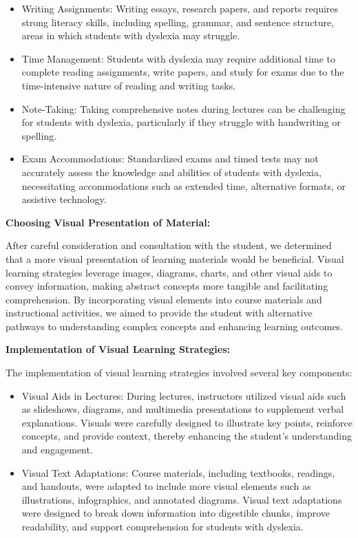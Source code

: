 \documentclass[a4paper,12pt]{article}
\begin{document}
\begin{large}
\begin{itemize}
\item Writing Assignments: Writing essays, research papers, and reports requires strong literacy skills, including spelling, grammar, and sentence structure, areas in which students with dyslexia may struggle.

\item Time Management: Students with dyslexia may require additional time to complete reading assignments, write papers, and study for exams due to the time-intensive nature of reading and writing tasks.

\item Note-Taking: Taking comprehensive notes during lectures can be challenging for students with dyslexia, particularly if they struggle with handwriting or spelling.

\item Exam Accommodations: Standardized exams and timed tests may not accurately assess the knowledge and abilities of students with dyslexia, necessitating accommodations such as extended time, alternative formats, or assistive technology.
\end{itemize}

\textbf{Choosing Visual Presentation of Material:}

After careful consideration and consultation with the student, we determined that a more visual presentation of learning materials would be beneficial. Visual learning strategies leverage images, diagrams, charts, and other visual aids to convey information, making abstract concepts more tangible and facilitating comprehension. By incorporating visual elements into course materials and instructional activities, we aimed to provide the student with alternative pathways to understanding complex concepts and enhancing learning outcomes.

\textbf{Implementation of Visual Learning Strategies:}

The implementation of visual learning strategies involved several key components:

\begin{itemize}
\item Visual Aids in Lectures: During lectures, instructors utilized visual aids such as slideshows, diagrams, and multimedia presentations to supplement verbal explanations. Visuals were carefully designed to illustrate key points, reinforce concepts, and provide context, thereby enhancing the student's understanding and engagement.

\item Visual Text Adaptations: Course materials, including textbooks, readings, and handouts, were adapted to include more visual elements such as illustrations, infographics, and annotated diagrams. Visual text adaptations were designed to break down information into digestible chunks, improve readability, and support comprehension for students with dyslexia.


\end{itemize}
\end{large}
\end{document}
